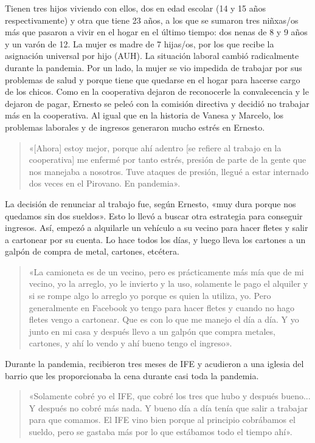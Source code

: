 Tienen tres hijos viviendo con ellos, dos en edad escolar (14 y 15 años respectivamente) y otra que tiene 23 años, a los que se sumaron tres niñxas/os más que pasaron a vivir en el hogar en el último tiempo: dos nenas de 8 y 9 años y un varón de 12. La mujer es madre de 7 hijas/os, por los que recibe la asignación universal por hijo (AUH). La situación laboral cambió radicalmente durante la pandemia. Por un lado, la mujer se vio impedida de trabajar por sus problemas de salud y porque tiene que quedarse en el hogar para hacerse cargo de los chicos. Como en la cooperativa dejaron de reconocerle la convalecencia y le dejaron de pagar, Ernesto se peleó con la comisión directiva y decidió no trabajar más en la cooperativa. Al igual que en la historia de Vanesa y Marcelo, los problemas laborales y de ingresos generaron mucho estrés en Ernesto.

\begin{quote}
«{[}Ahora{]} estoy mejor, porque ahí adentro {[}se refiere al trabajo en la cooperativa{]} me enfermé por tanto estrés, presión de parte de la gente que nos manejaba a nosotros. Tuve ataques de presión, llegué a estar internado dos veces en el Pirovano. En pandemia».
\end{quote}

La decisión de renunciar al trabajo fue, según Ernesto, «muy dura porque nos quedamos sin dos sueldos». Esto lo llevó a buscar otra estrategia para conseguir ingresos. Así, empezó a alquilarle un vehículo a su vecino para hacer fletes y salir a cartonear por su cuenta. Lo hace todos los días, y luego lleva los cartones a un galpón de compra de metal, cartones, etcétera.

\begin{quote}
«La camioneta es de un vecino, pero es prácticamente más mía que de mi vecino, yo la arreglo, yo le invierto y la uso, solamente le pago el alquiler y si se rompe algo lo arreglo yo porque es quien la utiliza, yo. Pero generalmente en Facebook yo tengo para hacer fletes y cuando no hago fletes vengo a cartonear. Que es con lo que me manejo el día a día. Y yo junto en mi casa y después llevo a un galpón que compra metales, cartones, y ahí lo vendo y ahí bueno tengo el ingreso».
\end{quote}

Durante la pandemia, recibieron tres meses de IFE y acudieron a una iglesia del barrio que les proporcionaba la cena durante casi toda la pandemia.

\begin{quote}
«Solamente cobré yo el IFE, que cobré los tres que hubo y después bueno... Y después no cobré más nada. Y bueno día a día tenía que salir a trabajar para que comamos. El IFE vino bien porque al principio cobrábamos el sueldo, pero se gastaba más por lo que estábamos todo el tiempo ahí».
\end{quote}

